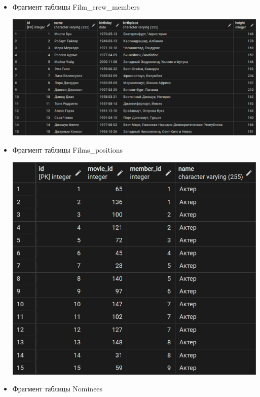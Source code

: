 \documentclass[a4paper,12pt]{article}
\renewcommand{\^}[2]{#1^{\, #2} \kern -1pt}
\newcommand{\1}{\kern 1pt}
\newcommand{\0}{\kern -1pt}
\begin{document}
\begin{itemize}
	
	\item Фрагмент таблицы Film\_crew\_members
	
	\includegraphics[scale=0.3,page=1]{table_inserts_examples/Film_crew_members}
	
	
	\item Фрагмент таблицы Films\_positions
	
	\includegraphics[scale=0.3,page=1]{table_inserts_examples/Films_positions}
	
	\newpage
	
	\item Фрагмент таблицы Nominees
	

\end{itemize}
\end{document}
